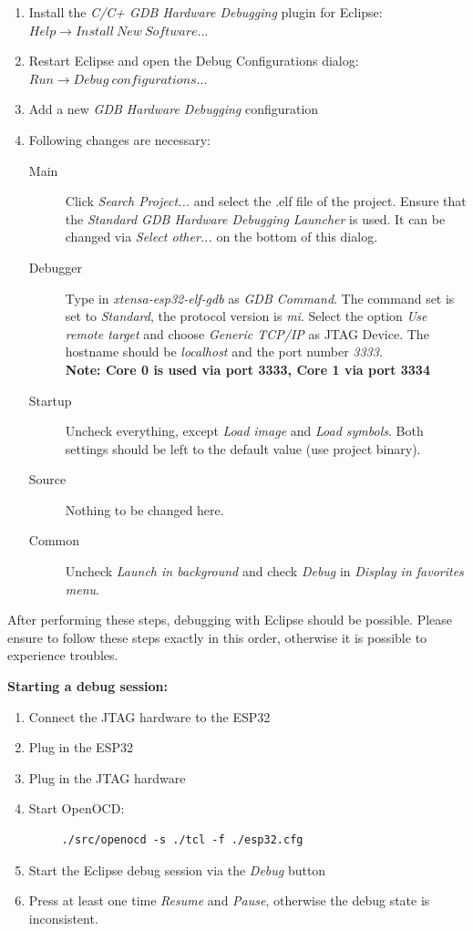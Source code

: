 \documentclass[]{scrreprt}%
\begin{document}
\begin{enumerate}
 \item Install the \textit{C/C+ GDB Hardware Debugging} plugin for Eclipse: \\
  $Help \rightarrow Install\ New\ Software...$
 \item Restart Eclipse and open the Debug Configurations dialog:\\
 $Run \rightarrow Debug\ configurations...$
 \item Add a new \textit{GDB Hardware Debugging} configuration
 \item Following changes are necessary:
  \begin{description}
   \item[Main] Click \textit{Search Project...} and select the .elf file of the project. Ensure that the \textit{Standard GDB Hardware Debugging Launcher}
   is used. It can be changed via \textit{Select other...} on the bottom of this dialog.
   \item[Debugger] Type in \textit{xtensa-esp32-elf-gdb} as \textit{GDB Command}. The command set is set to \textit{Standard}, the protocol version is \textit{mi}.
    Select the option \textit{Use remote target} and choose \textit{Generic TCP/IP} as JTAG Device. The hostname should be \textit{localhost} and the port number \textit{3333}.\\
    \textbf{Note: Core 0 is used via port 3333, Core 1 via port 3334}
   \item[Startup] Uncheck everything, except \textit{Load image} and \textit{Load symbols}. Both settings should be left to the default value (use project binary).
   \item[Source] Nothing to be changed here.
   \item[Common] Uncheck \textit{Launch in background} and check \textit{Debug} in \textit{Display in favorites menu}.
  \end{description}
\end{enumerate}

After performing these steps, debugging with Eclipse should be possible. Please ensure to follow these steps exactly in this order, otherwise it is possible to experience
troubles.

\textbf{Starting a debug session:}\\

\begin{enumerate}
 \item Connect the JTAG hardware to the ESP32
 \item Plug in the ESP32
 \item Plug in the JTAG hardware
 \item Start OpenOCD:
    \begin{lstlisting}
     ./src/openocd -s ./tcl -f ./esp32.cfg
    \end{lstlisting}
 \item Start the Eclipse debug session via the \textit{Debug} button
 \item Press at least one time \textit{Resume} and  \textit{Pause}, otherwise the debug state is inconsistent.
\end{enumerate}
\end{document}
